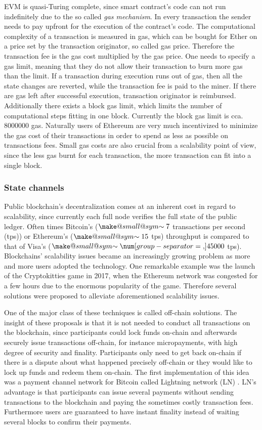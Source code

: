 \documentclass[conference, compsoc]{IEEEtran}
\makeatletter
\theoremstyle{definition}
\newcommand{\smallsim}{\smallsym{\mathrel}{\sim}}
\newcommand{\smallsym}[2]{#1{\mathpalette\make@small@sym{#2}}}
\newcommand{\make@small@sym}[2]{%
	\vcenter{\hbox{$\m@th\downgrade@style#1#2$}}%
}
\newcommand{\downgrade@style}[1]{%
	\ifx#1\displaystyle\scriptstyle\else
	\ifx#1\textstyle\scriptstyle\else
	\scriptscriptstyle
	\fi\fi
}
\makeatother
\begin{document}
EVM is quasi-Turing complete, since smart contract's code can not run indefinitely due to the so called \textit{gas mechanism}. In every transaction the sender needs to pay upfront for the execution of the contract's code. The computational complexity of a transaction is measured in gas, which can be bought for Ether on a price set by the transaction originator, so called gas price. Therefore the transaction fee is the gas cost multiplied by the gas price. One needs to specify a gas limit, meaning that they do not allow their transaction to burn more gas than the limit. If a transaction during execution runs out of gas, then all the state changes are reverted, while the transaction fee is paid to the miner. If there are gas left after successful execution, transaction originator is reimbursed. Additionally there exists a block gas limit, which limits the number of computational steps fitting in one block. Currently the block gas limit is cca. $\num[group-separator={,}]{8000000}$ gas. Naturally users of Ethereum are very much incentivized to minimize the gas cost of their transactions in order to spend as less as possible on transactions fees. Small gas costs are also crucial from a scalability point of view, since the less gas burnt for each transaction, the more transaction can fit into a single block.   

\subsubsection{State channels} 
Public blockchain's decentralization comes at an inherent cost in regard to scalability, since currently each full node verifies the full state of the public ledger. Often times Bitcoin's ($\smallsim7$ transactions per second (tps)) or Ethereum's ($\smallsim15$ tps) throughput is compared to that of Visa's ($\smallsim\num[group-separator={,}]{45000}$ tps). Blockchains' scalability issues became an increasingly growing problem as more and more users adopted the technology. One remarkable example was the launch of the Cryptokitties game in 2017, when the Ethereum network was congested for a few hours due to the enormous popularity of the game. Therefore several solutions were proposed to alleviate aforementioned scalability issues.

One of the major class of these techniques is called off-chain solutions. The insight of these proposals is that it is not needed to conduct all transactions on the blockchain, since participants could lock funds on-chain and afterwards securely issue transactions off-chain, for instance micropayments, with high degree of security and finality. Participants only need to get back on-chain if there is a dispute about what happened precisely off-chain or they would like to lock up funds and redeem them on-chain. The first implementation of this idea was a payment channel network for Bitcoin called Lightning network (LN) \cite{poon2016bitcoin}. LN's advantage is that participants can issue several payments without sending transactions to the blockchain and paying the sometimes costly transaction fees. Furthermore users are guaranteed to have instant finality instead of waiting several blocks to confirm their payments. 
\end{document}
